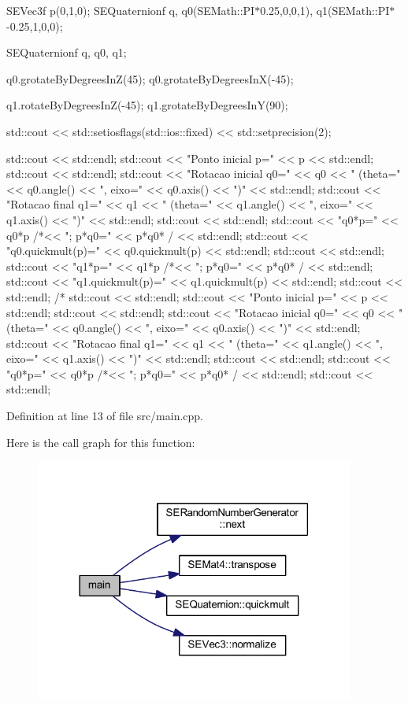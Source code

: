 S\+E\+Vec3f p(0,1,0); S\+E\+Quaternionf q, q0(S\+E\+Math\+::\+P\+I$\ast$0.25,0,0,1), q1(S\+E\+Math\+::\+P\+I$\ast$-\/0.25,1,0,0); \begin{DoxyVerb}SEQuaternionf q, q0, q1;

q0.grotateByDegreesInZ(45); q0.grotateByDegreesInX(-45);

q1.rotateByDegreesInZ(-45); q1.grotateByDegreesInY(90);

std::cout << std::setiosflags(std::ios::fixed) << std::setprecision(2);

std::cout << std::endl;
std::cout << "Ponto inicial p=" << p << std::endl;
std::cout << std::endl;
std::cout << "Rotacao inicial q0=" << q0 << " (theta=" << q0.angle() << ", eixo=" << q0.axis() << ")" << std::endl;
std::cout << "Rotacao final q1=" << q1 << " (theta=" << q1.angle() << ", eixo=" << q1.axis() << ")" << std::endl;
std::cout << std::endl;
std::cout << "q0*p=" << q0*p /*<< "; p*q0=" << p*q0* / << std::endl;
std::cout << "q0.quickmult(p)=" << q0.quickmult(p) << std::endl;
std::cout << std::endl;
std::cout << "q1*p=" << q1*p /*<< "; p*q0=" << p*q0* / << std::endl;
std::cout << "q1.quickmult(p)=" << q1.quickmult(p) << std::endl;
std::cout << std::endl;
/*
std::cout << std::endl;
std::cout << "Ponto inicial p=" << p << std::endl;
std::cout << std::endl;
std::cout << "Rotacao inicial q0=" << q0 << " (theta=" << q0.angle() << ", eixo=" << q0.axis() << ")" << std::endl;
std::cout << "Rotacao final q1=" << q1 << " (theta=" << q1.angle() << ", eixo=" << q1.axis() << ")" << std::endl;
std::cout << std::endl;
std::cout << "q0*p=" << q0*p /*<< "; p*q0=" << p*q0* / << std::endl;
std::cout << std::endl;
\end{DoxyVerb}


Definition at line 13 of file src/main.\+cpp.



Here is the call graph for this function\+:
\nopagebreak
\begin{figure}[H]
\begin{center}
\leavevmode
\includegraphics[width=297pt]{src_2main_8cpp_a0ddf1224851353fc92bfbff6f499fa97_cgraph}
\end{center}
\end{figure}


